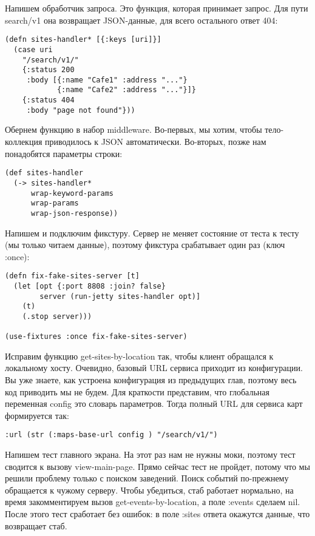 Напишем обработчик запроса. Это функция, которая принимает запрос. Для пути
search/v1 она возвращает JSON-данные, для всего остального ответ 404:

\begin{verbatim}
(defn sites-handler* [{:keys [uri]}]
  (case uri
    "/search/v1/"
    {:status 200
     :body [{:name "Cafe1" :address "..."}
            {:name "Cafe2" :address "..."}]}
    {:status 404
     :body "page not found"}))
\end{verbatim}

Обернем функцию в набор middleware. Во-первых, мы хотим, чтобы тело-коллекция
приводилось к JSON автоматически. Во-вторых, позже нам понадобятся параметры
строки:

\begin{verbatim}
(def sites-handler
  (-> sites-handler*
      wrap-keyword-params
      wrap-params
      wrap-json-response))
\end{verbatim}

Напишем и подключим фикстуру. Сервер не меняет состояние от теста к тесту (мы
только читаем данные), поэтому фикстура срабатывает один раз (ключ :once):

\begin{verbatim}
(defn fix-fake-sites-server [t]
  (let [opt {:port 8808 :join? false}
        server (run-jetty sites-handler opt)]
    (t)
    (.stop server)))

(use-fixtures :once fix-fake-sites-server)
\end{verbatim}

Исправим функцию get-sites-by-location так, чтобы клиент обращался к локальному
хосту. Очевидно, базовый URL сервиса приходит из конфигурации. Вы уже знаете,
как устроена конфигурация из предыдущих глав, поэтому весь код приводить мы не
будем. Для краткости представим, что глобальная переменная config это словарь
параметров. Тогда полный URL для сервиса карт формируется так:

\begin{verbatim}
:url (str (:maps-base-url config ) "/search/v1/")
\end{verbatim}

Напишем тест главного экрана. На этот раз нам не нужны моки, поэтому тест
сводится к вызову view-main-page. Прямо сейчас тест не пройдет, потому что мы
решили проблему только с поиском заведений. Поиск событий по-прежнему обращается
к чужому серверу. Чтобы убедиться, стаб работает нормально, на время
закомментируем вызов get-events-by-location, а поле :events сделаем nil. После
этого тест сработает без ошибок: в поле :sites ответа окажутся данные, что
возвращает стаб.

